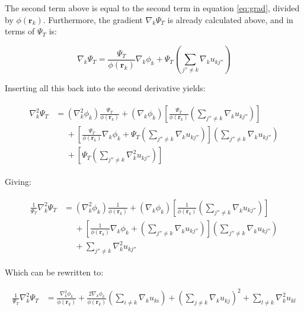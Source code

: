\documentclass[english, a4paper]{article}
\newcommand{\bm}[1]{\mathbf{#1}}
\begin{document}
The second term above is equal to the second term in equation \ref{eq:grad}, divided by $\phi(\bm{r}_k)$. Furthermore, the gradient $\nabla_k\Psi_T$ is already calculated above, and in terms of $\Psi_T$ is:

\begin{equation}
	\nabla_k\Psi_T = \frac{\Psi_T}{\phi(\bm{r}_k)}\nabla_k\phi_k + \Psi_T\left(\sum_{j''\neq k}\nabla_ku_{kj''} \right)
\end{equation}

Inserting all this back into the second derivative yields:

\begin{align}
	\begin{split}
	\nabla_k^2\Psi_T &= (\nabla_k^2\phi_k)\frac{\Psi_T}{\phi(\bm{r}_k)} + (\nabla_k\phi_k) \left[\frac{\Psi_T}{\phi(\bm{r}_k)}\left(\sum_{j''\neq k}\nabla_ku_{kj''} \right)\right]\\
	&\:\:\:\:\:\: + \left[\frac{\Psi_T}{\phi(\bm{r}_k)}\nabla_k\phi_k + \Psi_T\left(\sum_{j''\neq k}\nabla_ku_{kj''} \right)\right]\left(\sum_{j''\neq k}\nabla_ku_{kj''} \right)\\
	&\:\:\:\:\:\: + \left[\Psi_T\left(\sum_{j''\neq k}\nabla_k^2u_{kj''} \right)\right]
	\end{split}
\end{align}

Giving:

\begin{align}
	\begin{split}
	\frac{1}{\Psi_T}\nabla_k^2\Psi_T &= (\nabla_k^2\phi_k)\frac{1}{\phi(\bm{r}_k)} + (\nabla_k\phi_k) \left[\frac{1}{\phi(\bm{r}_k)}\left(\sum_{j''\neq k}\nabla_ku_{kj''} \right)\right]\\
	&\:\:\:\:\:\: + \left[\frac{1}{\phi(\bm{r}_k)}\nabla_k\phi_k + \left(\sum_{j''\neq k}\nabla_ku_{kj''} \right)\right]\left(\sum_{j''\neq k}\nabla_ku_{kj''} \right)\\
	&\:\:\:\:\:\: + \sum_{j''\neq k}\nabla_k^2u_{kj''}
	\end{split}
\end{align}

Which can be rewritten to:

\begin{align}
	\frac{1}{\Psi_T}\nabla_k^2\Psi_T &= \frac{\nabla_k^2\phi_k}{\phi(\bm{r}_k)} + \frac{2\nabla_k\phi_k}{\phi(\bm{r}_k)}\left(\sum_{i\neq k}\nabla_ku_{ki} \right) + \left(\sum_{j\neq k}\nabla_ku_{kj} \right)^2 + \sum_{l\neq k}\nabla_k^2u_{kl}
\end{align}
\end{document}
